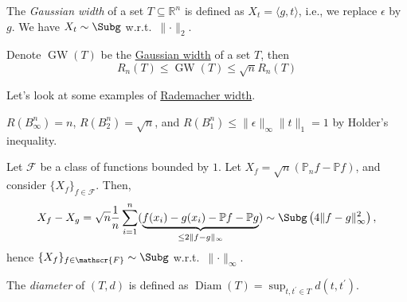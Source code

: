 \begin{eg}\label{eg:Gaussian-width}
	The \emph{Gaussian width} of a set \(T \subseteq \mathbb{R} ^n\) is defined as \(X_t = \langle g, t \rangle \), i.e., we replace \(\epsilon \) by \(g\). We have \(X_t \sim \Subg\) w.r.t.\ \(\lVert \cdot \rVert _2\).
\end{eg}

\begin{theorem}
	Denote \(\mathop{\mathrm{GW}}(T) \) be the \hyperref[eg:Gaussian-width]{Gaussian width} of a set \(T\), then
	\[
		R_n(T) \leq \mathop{\mathrm{GW}}(T) \leq \sqrt{n} R_n(T)
	\]
\end{theorem}

Let's look at some examples of \hyperref[def:Rademacher-width]{Rademacher width}.

\begin{eg}
	\(R(B_\infty ^n) = n\), \(R(B_2^n)= \sqrt{n} \), and \(R(B_1^n) \leq \lVert \epsilon \rVert _\infty \lVert t \rVert _1 = 1\) by Holder's inequality.
\end{eg}

\begin{eg}
	Let \(\mathscr{F} \) be a class of functions bounded by \(1\). Let \(X_f = \sqrt{n} (\mathbb{P} _n f - \mathbb{P} f)\), and consider \(\{ X_f \}_{f\in \mathscr{F} } \). Then,
	\[
		X_f - X_g
		= \sqrt{n} \frac{1}{n}\sum_{i=1}^{n} ( \underbrace{f(x_i) - g(x_i) - \mathbb{P} f - \mathbb{P} g }_{\leq 2 \lVert f-g \rVert _\infty })
		\sim \Subg\left( 4 \lVert f - g \rVert _\infty ^2 \right) ,
	\]
	hence \(\{ X_f \} _{f\in \mathscr{F} } \sim \Subg\) w.r.t.\ \(\lVert \cdot \rVert _\infty \).
\end{eg}

\begin{definition}[Diameter]\label{def:diameter}
	The \emph{diameter} of \((T, d)\) is defined as \(\mathop{\mathrm{Diam}}(T) = \sup _{t, t^{\prime} \in T} d(t, t^{\prime} )\).
\end{definition}

